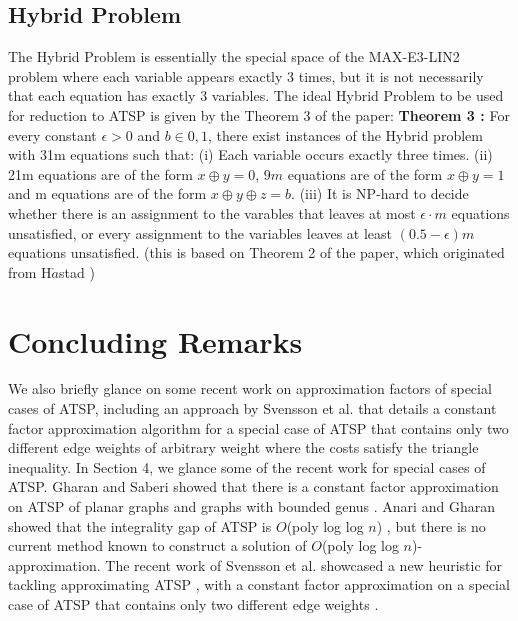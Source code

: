 \documentclass[oneside]{projectpaper} %
\begin{document}
\subsection{Hybrid Problem}
The Hybrid Problem is essentially the special space of the MAX-E3-LIN2 problem where each variable appears exactly 3 times, but it is not necessarily that each equation has exactly 3 variables. The ideal Hybrid Problem to be used for reduction to ATSP is given by the Theorem 3 of the paper:
\newline
\newline
\textbf{Theorem 3 \cite{KLS15}:} For every constant $\epsilon > 0$ and $b \in {0,1}$, there exist instances of the Hybrid problem with 31m equations such that: \newline
(i) Each variable occurs exactly three times. \newline
(ii) 21m equations are of the form $x \oplus y = 0$, $9m$ equations are of the form $x \oplus y = 1$ and m equations are of the form $x \oplus y \oplus z = b$. \newline
(iii) It is NP-hard to decide whether there is an assignment to the varables that leaves at most $\epsilon \cdot m$ equations unsatisfied, or every assignment to the variables leaves at least $(0.5 - \epsilon)m$ equations unsatisfied. (this is based on Theorem 2 of the paper, which originated from H$\mathring{a}$stad \cite{Has01}) \newline

\section{Concluding Remarks}
We also briefly glance on some recent work on approximation factors of special cases of ATSP, including an approach by Svensson et al.\cite{STV16} that details a constant factor approximation algorithm for a special case of ATSP that contains only two different edge weights of arbitrary weight where the costs satisfy the triangle inequality. \indent In Section 4, we glance some of the recent work for special cases of ATSP.  Gharan and Saberi showed that there is a constant factor approximation on ATSP of planar graphs and graphs with bounded genus \cite{GS11}. Anari and Gharan showed that the integrality gap of ATSP is $O$(poly log log $n$) \cite{AG15}, but there is no current method known to construct a solution of $O$(poly log log $n$)-approximation. The recent work of Svensson et al. showcased a new heuristic for tackling approximating ATSP \cite{Sve15}, with a constant factor approximation on a special case of ATSP that contains only two different edge weights \cite{STV16}. \newline

\nocite{*}


\end{document}
